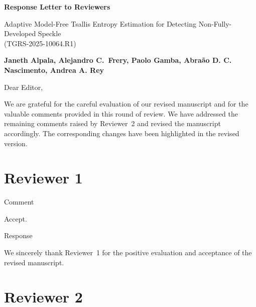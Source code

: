 \documentclass[11pt]{report}
\begin{document}
\begin{center}
\large{\textbf{Response Letter to Reviewers}}

\vglue 0.3cm

\huge{
Adaptive Model-Free Tsallis Entropy Estimation for Detecting Non-Fully-Developed Speckle\\
(TGRS-2025-10064.R1)
}
\end{center}

\begin{center}
\textbf{
Janeth Alpala, Alejandro C.\ Frery, Paolo Gamba, Abra\~ao D. C. Nascimento, Andrea A. Rey
}
\end{center}

\date{ }


\noindent Dear Editor,

\bigskip

\noindent We are grateful for the careful evaluation of our revised manuscript and for the valuable comments provided in this round of review. We have addressed the remaining comments raised by Reviewer~2 and revised the manuscript accordingly. The corresponding changes have been highlighted in the revised version. 


\medskip

\section*{Reviewer 1}

\begin{reviewbox}{Comment}

Accept.

\end{reviewbox}

\begin{responsebox}{Response}

We sincerely thank Reviewer~1 for the positive evaluation and acceptance of the revised manuscript.

\end{responsebox}

\section*{Reviewer 2}
\end{document}
